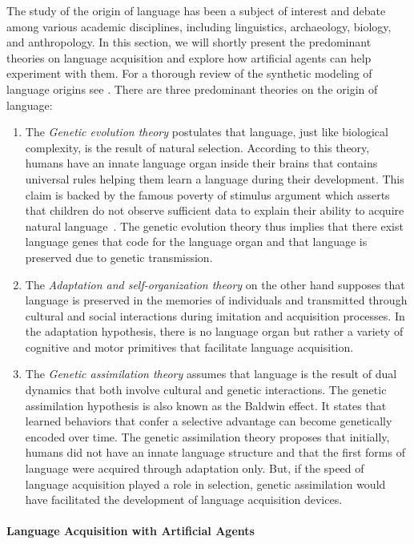 The study of the origin of language has been a subject of interest and debate among various academic disciplines, including linguistics, archaeology, biology, and anthropology. In this section, we will shortly present the predominant theories on language acquisition and explore how artificial agents can help experiment with them. For a thorough review of the synthetic modeling of language origins see \citet{steels1997evolution}. There are three predominant theories on the origin of language:
\begin{enumerate}[noitemsep]
\item The \textit{Genetic evolution theory} postulates that language, just like biological complexity,  is the result of natural selection. According to this theory, humans have an innate language organ inside their brains that contains universal rules helping them learn a language during their development. This claim is backed by the famous poverty of stimulus argument which asserts that children do not observe sufficient data to explain their ability to acquire natural language~\citep{chomsky1975reflections}. The genetic evolution theory thus implies that there exist language genes that code for the language organ and that language is preserved due to genetic transmission. 
\item The \textit{Adaptation and self-organization theory} on the other hand supposes that language is preserved in the memories of individuals and transmitted through cultural and social interactions during imitation and acquisition processes. In the adaptation hypothesis, there is no language organ but rather a variety of cognitive and motor primitives that facilitate language acquisition. 
\item The \textit{Genetic assimilation theory} assumes that language is the result of dual dynamics that both involve cultural and genetic interactions. The genetic assimilation hypothesis is also known as the Baldwin effect. It states that learned behaviors that confer a selective advantage can become genetically encoded over time.  The genetic assimilation theory proposes that initially, humans did not have an innate language structure and that the first forms of language were acquired through adaptation only. But, if the speed of language acquisition played a role in selection, genetic assimilation would have facilitated the development of language acquisition devices.
\end{enumerate}

\paragraph{Language Acquisition with Artificial Agents}



